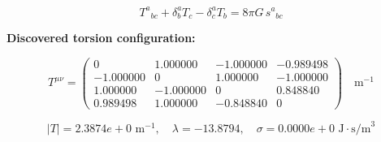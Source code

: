 
\begin{equation}
  T^a{}_{bc} + \delta^a_b T_c - \delta^a_c T_b = 8\pi G \, s^a{}_{bc}
\end{equation}

\textbf{Discovered torsion configuration:}

\begin{equation}
  T^{\mu\nu} = \begin{pmatrix}
    0 & 1.000000 & -1.000000 & -0.989498 \\
    -1.000000 & 0 & 1.000000 & -1.000000 \\
    1.000000 & -1.000000 & 0 & 0.848840 \\
    0.989498 & 1.000000 & -0.848840 & 0
  \end{pmatrix} \quad \text{m}^{-1}
\end{equation}

\begin{equation}
  |T| = 2.3874e+0 \text{ m}^{-1}, \quad
  \lambda = -13.8794, \quad
  \sigma = 0.0000e+0 \text{ J}\cdot\text{s/m}^3
\end{equation}